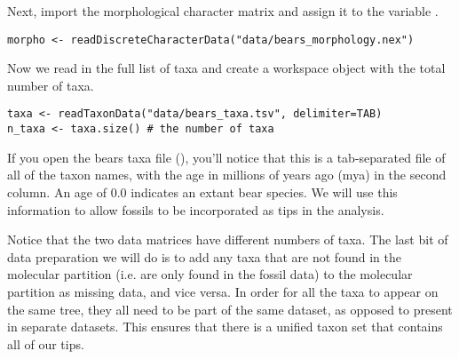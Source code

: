Next, import the morphological character matrix and assign it to the variable . 
{\tt \begin{snugshade*}
\begin{lstlisting}
morpho <- readDiscreteCharacterData("data/bears_morphology.nex")
\end{lstlisting}
\end{snugshade*}}

%

Now we read in the full list of taxa and create a workspace object with the total number of taxa. 

{\tt \begin{snugshade*}
\begin{lstlisting}
taxa <- readTaxonData("data/bears_taxa.tsv", delimiter=TAB)
n_taxa <- taxa.size() # the number of taxa
\end{lstlisting}
\end{snugshade*}}

If you open the bears taxa file (), you'll notice that this is a tab-separated file of all of the taxon names, with the age in millions of years ago (mya) in the second column. 
An age of 0.0 indicates an extant bear species. 
We will use this information to allow fossils to be incorporated as tips in the analysis. 

Notice that the two data matrices have different numbers of taxa. The last bit of data preparation we will do is to add any taxa that are not found in the molecular partition (i.e. are only found in the fossil data) to the molecular partition as missing data, and vice versa.
In order for all the taxa to appear on the same tree, they all need to be part of the same dataset, as opposed to present in separate datasets. 
This ensures that there is a unified taxon set that contains all of our tips.

